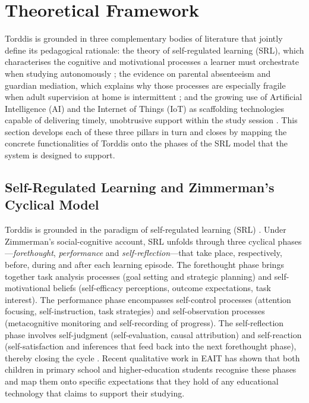 \section{Theoretical Framework}
\label{section:second}
Torddis is grounded in three complementary bodies of literature that jointly define its pedagogical rationale: the theory of self-regulated learning (SRL), which characterises the cognitive and motivational processes a learner must orchestrate when studying autonomously \citep{Zimmerman2000Attaining, Panadero2017Review}; the evidence on parental absenteeism and guardian mediation, which explains why those processes are especially fragile when adult supervision at home is intermittent \citep{Seidu2022Truancy, Wang2025Cultivating}; and the growing use of Artificial Intelligence (AI) and the Internet of Things (IoT) as scaffolding technologies capable of delivering timely, unobtrusive support within the study session \citep{Wang2025Development, Ackermans2025Young}. This section develops each of these three pillars in turn and closes by mapping the concrete functionalities of Torddis onto the phases of the SRL model that the system is designed to support.

\subsection{Self-Regulated Learning and Zimmerman's Cyclical Model}
\label{sec:srl-model}
Torddis is grounded in the paradigm of self-regulated learning (SRL) \citep{Zimmerman2000Attaining, Panadero2017Review}. Under Zimmerman's social-cognitive account, SRL unfolds through three cyclical phases---\textit{forethought}, \textit{performance} and \textit{self-reflection}---that take place, respectively, before, during and after each learning episode. The forethought phase brings together task analysis processes (goal setting and strategic planning) and self-motivational beliefs (self-efficacy perceptions, outcome expectations, task interest). The performance phase encompasses self-control processes (attention focusing, self-instruction, task strategies) and self-observation processes (metacognitive monitoring and self-recording of progress). The self-reflection phase involves self-judgment (self-evaluation, causal attribution) and self-reaction (self-satisfaction and inferences that feed back into the next forethought phase), thereby closing the cycle \citep{Amaefule2025Childrens, Kleimola2025Promoting}. Recent qualitative work in EAIT has shown that both children in primary school \citep{Amaefule2025Childrens} and higher-education students \citep{Kleimola2025Promoting} recognise these phases and map them onto specific expectations that they hold of any educational technology that claims to support their studying.

